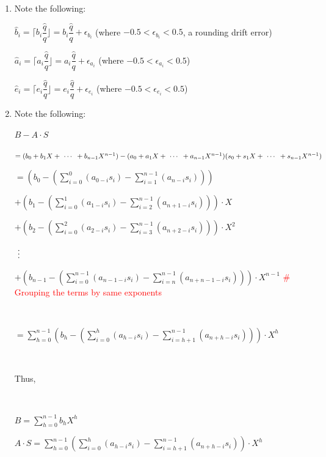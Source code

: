 \begin{enumerate}
\item Note the following: 

$\hat{b}_i = \Big\lceil b_i \dfrac{\hat{q}}{q} \Big\rfloor = b_i\dfrac{\hat{q}}{q} + \epsilon_{b_i}$ (where $-0.5 < \epsilon_{b_i} < 0.5$, a rounding drift error)

$\hat{a}_i = \Big\lceil a_i \dfrac{\hat{q}}{q} \Big\rfloor = a_i\dfrac{\hat{q}}{q} + \epsilon_{a_i}$ (where $-0.5 < \epsilon_{a_i} < 0.5$)

$\hat{e}_i = \Big\lceil e_i \dfrac{\hat{q}}{q} \Big\rfloor = e_i\dfrac{\hat{q}}{q} + \epsilon_{e_i}$ (where $-0.5 < \epsilon_{e_i} < 0.5$)

\item Note the following: 


$B - A\cdot S$ 

$ = (b_0 + b_1X + \text{ } \text{$\cdots$} \text{ } + b_{n-1}X^{n-1} ) - (a_{0} + a_{1}X + \text{ } \text{$\cdots$} \text{ } + a_{n-1}X^{n-1})(s_{0} + s_{1}X + \text{ } \text{$\cdots$} \text{ } + s_{n-1}X^{n-1})$ 


$ = \left(b_0 - \left( \sum\limits_{i=0}^{0}(a_{0-i}s_{i}) - \sum\limits_{i=1}^{n-1}(a_{n-i}s_{i}) \right)\right)$

$ + \left(b_1 - \left( \sum\limits_{i=0}^{1}(a_{1-i}s_{i}) - \sum\limits_{i=2}^{n-1}(a_{n+1-i}s_{i})   \right) \right)\cdot X$ 



$ + \left(b_2 - \left( \sum\limits_{i=0}^{2}(a_{2-i}s_{i}) - \sum\limits_{i=3}^{n-1}(a_{n+2-i}s_{i})   \right) \right)\cdot X^2$ 


$\text{ } \text{$\vdots$} \text{ }$ 


$ + \left(b_{n-1} - \left(  \sum\limits_{i=0}^{n-1}(a_{n-1-i}s_{i}) -  \sum\limits_{i=n}^{n-1}(a_{n+n-1-i}s_{i})  \right) \right)\cdot X^{n-1}$ \textcolor{red}{\# Grouping the terms by same exponents}

$ $

$= \sum\limits_{h=0}^{n-1}  \left(b_h - \left( \sum\limits_{i=0}^{h}(a_{h-i}s_{i}) -  \sum\limits_{i=h+1}^{n-1}(a_{n+h-i}s_{i})  \right) \right)\cdot X^{h}  $

$ $

Thus,

$ $

$B = \sum\limits_{h=0}^{n-1}  b_h  X^{h}  $

$A\cdot S = \sum\limits_{h=0}^{n-1}  \left(\sum\limits_{i=0}^{h}(a_{h-i}s_{i}) - \sum\limits_{i=h+1}^{n-1}(a_{n+h-i}s_{i}) \right)\cdot X^{h}  $



\end{enumerate}
